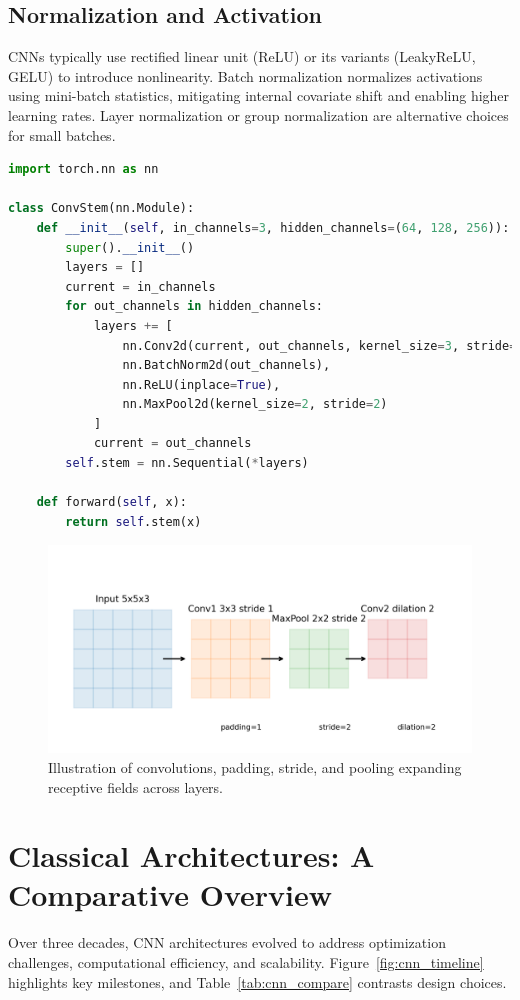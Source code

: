 ﻿\documentclass[12pt]{article}
\begin{document}
\subsection{Normalization and Activation}
CNNs typically use rectified linear unit (ReLU) or its variants (LeakyReLU, GELU) to introduce nonlinearity. Batch normalization normalizes activations using mini-batch statistics, mitigating internal covariate shift and enabling higher learning rates. Layer normalization or group normalization are alternative choices for small batches.

\begin{lstlisting}[language=Python, caption={PyTorch implementation of a convolutional stem with normalization and pooling.}]
import torch.nn as nn

class ConvStem(nn.Module):
    def __init__(self, in_channels=3, hidden_channels=(64, 128, 256)):
        super().__init__()
        layers = []
        current = in_channels
        for out_channels in hidden_channels:
            layers += [
                nn.Conv2d(current, out_channels, kernel_size=3, stride=1, padding=1, bias=False),
                nn.BatchNorm2d(out_channels),
                nn.ReLU(inplace=True),
                nn.MaxPool2d(kernel_size=2, stride=2)
            ]
            current = out_channels
        self.stem = nn.Sequential(*layers)

    def forward(self, x):
        return self.stem(x)
\end{lstlisting}

\begin{figure}[H]
  \centering
  \includegraphics[width=0.85\linewidth]{cnn_structure_receptive_field.png}
  \caption{Illustration of convolutions, padding, stride, and pooling expanding receptive fields across layers.}
  \label{fig:cnn_structure}
\end{figure}
\FloatBarrier

\section{Classical Architectures: A Comparative Overview}
Over three decades, CNN architectures evolved to address optimization challenges, computational efficiency, and scalability. Figure~\ref{fig:cnn_timeline} highlights key milestones, and Table~\ref{tab:cnn_compare} contrasts design choices.
\end{document}
